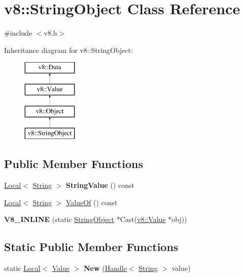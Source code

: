 \hypertarget{classv8_1_1_string_object}{}\section{v8\+:\+:String\+Object Class Reference}
\label{classv8_1_1_string_object}


{\ttfamily \#include $<$v8.\+h$>$}

Inheritance diagram for v8\+:\+:String\+Object\+:\begin{figure}[H]
\begin{center}
\leavevmode
\includegraphics[height=4.000000cm]{classv8_1_1_string_object}
\end{center}
\end{figure}
\subsection*{Public Member Functions}
\begin{DoxyCompactItemize}
\item 
\hypertarget{classv8_1_1_string_object_a7fc2bf2ec12bedb44dc735988508ab94}{}\hyperlink{classv8_1_1_local}{Local}$<$ \hyperlink{classv8_1_1_string}{String} $>$ {\bfseries String\+Value} () const \label{classv8_1_1_string_object_a7fc2bf2ec12bedb44dc735988508ab94}

\item 
\hyperlink{classv8_1_1_local}{Local}$<$ \hyperlink{classv8_1_1_string}{String} $>$ \hyperlink{classv8_1_1_string_object_a96bd6c736a0272ab7e683038953077e4}{Value\+Of} () const 
\item 
\hypertarget{classv8_1_1_string_object_aeb7ecd92b9fc0c4c5a2e51e166e5d19e}{}{\bfseries V8\+\_\+\+I\+N\+L\+I\+N\+E} (static \hyperlink{classv8_1_1_string_object}{String\+Object} $\ast$Cast(\hyperlink{classv8_1_1_value}{v8\+::\+Value} $\ast$obj))\label{classv8_1_1_string_object_aeb7ecd92b9fc0c4c5a2e51e166e5d19e}

\end{DoxyCompactItemize}
\subsection*{Static Public Member Functions}
\begin{DoxyCompactItemize}
\item 
\hypertarget{classv8_1_1_string_object_a299c1d30b32e8bc336c8af05471a0763}{}static \hyperlink{classv8_1_1_local}{Local}$<$ \hyperlink{classv8_1_1_value}{Value} $>$ {\bfseries New} (\hyperlink{classv8_1_1_handle}{Handle}$<$ \hyperlink{classv8_1_1_string}{String} $>$ value)\label{classv8_1_1_string_object_a299c1d30b32e8bc336c8af05471a0763}

\end{DoxyCompactItemize}


